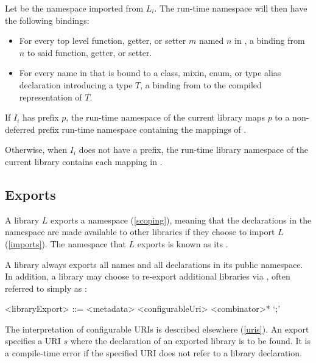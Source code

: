 \documentclass[makeidx]{article}
\begin{document}
{\LMHash{}%
Let  be the namespace imported from $L_i$.
The run-time namespace  will then have the following bindings:

\begin{itemize}
\item
  For every top level function, getter, or setter $m$ named $n$ in
  ,
  a binding from $n$ to said function, getter, or setter.
\item
  For every name \id{} in 
  that is bound to a class, mixin, enum, or type alias declaration
  introducing a type $T$,
  a binding from \id{} to the compiled representation of $T$.
\end{itemize}

\LMHash{}%
If $I_i$ has prefix $p$,
the run-time namespace of the current library
maps $p$ to a non-deferred prefix run-time namespace 
containing the mappings of .


\LMHash{}%
Otherwise, when $I_i$ does not have a prefix,
the run-time library namespace of the current library
contains each mapping in .
\EndCase


\subsection{Exports}

\LMHash{}%
A library $L$ exports a namespace (\ref{scoping}), meaning that
the declarations in the namespace are made available to other libraries
if they choose to import $L$ (\ref{imports}).
The namespace that $L$ exports is known as its
.

\LMHash{}%
A library always exports all names and all declarations in its public namespace.
In addition, a library may choose to re-export additional libraries
via , often referred to simply as :

\begin{grammar}
<libraryExport> ::= <metadata> \EXPORT{} <configurableUri> <combinator>* `;'
\end{grammar}

\LMHash{}%
The interpretation of configurable URIs is described elsewhere
(\ref{uris}).
An export specifies a URI $s$
where the declaration of an exported library is to be found.
It is a compile-time error if the specified URI
does not refer to a library declaration.

}
\end{document}
